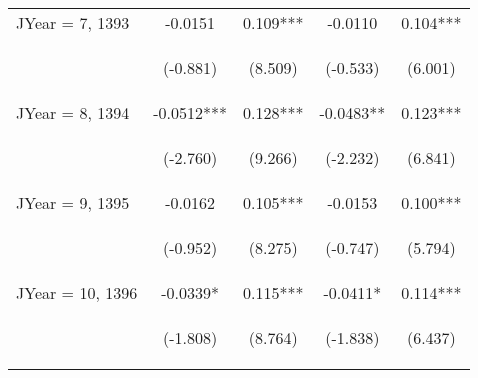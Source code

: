 \documentclass[]{article}
\begin{document}
\begin{center}
\begin{tabular}{lcccc}
JYear = 7, 1393 & -0.0151 & 0.109*** & -0.0110 & 0.104*** \\
\vspace{4pt} & \begin{footnotesize}(-0.881)\end{footnotesize} & \begin{footnotesize}(8.509)\end{footnotesize} & \begin{footnotesize}(-0.533)\end{footnotesize} & \begin{footnotesize}(6.001)\end{footnotesize} \\
JYear = 8, 1394 & -0.0512*** & 0.128*** & -0.0483** & 0.123*** \\
\vspace{4pt} & \begin{footnotesize}(-2.760)\end{footnotesize} & \begin{footnotesize}(9.266)\end{footnotesize} & \begin{footnotesize}(-2.232)\end{footnotesize} & \begin{footnotesize}(6.841)\end{footnotesize} \\
JYear = 9, 1395 & -0.0162 & 0.105*** & -0.0153 & 0.100*** \\
\vspace{4pt} & \begin{footnotesize}(-0.952)\end{footnotesize} & \begin{footnotesize}(8.275)\end{footnotesize} & \begin{footnotesize}(-0.747)\end{footnotesize} & \begin{footnotesize}(5.794)\end{footnotesize} \\
JYear = 10, 1396 & -0.0339* & 0.115*** & -0.0411* & 0.114*** \\
\vspace{4pt} & \begin{footnotesize}(-1.808)\end{footnotesize} & \begin{footnotesize}(8.764)\end{footnotesize} & \begin{footnotesize}(-1.838)\end{footnotesize} & \begin{footnotesize}(6.437)\end{footnotesize} \\

\end{tabular}
\end{center}
\end{document}
